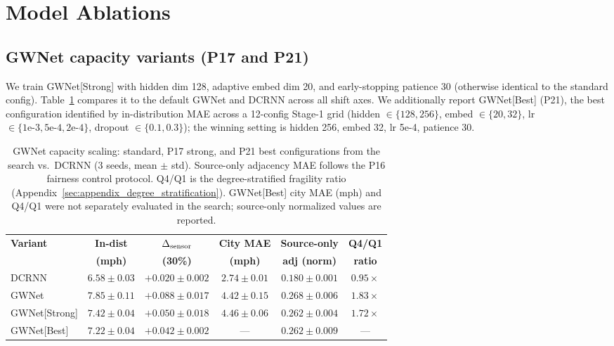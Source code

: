 \section{Model Ablations}
\label{sec:appendix_ablations_group}

\subsection{GWNet capacity variants (P17 and P21)}
\label{sec:appendix_stronger_gwnet}

We train GWNet[Strong] with hidden dim 128, adaptive embed dim 20, and early-stopping
patience 30 (otherwise identical to the standard config). Table~\ref{tab:stronger_gwnet}
compares it to the default GWNet and DCRNN across all shift axes.
We additionally report GWNet[Best] (P21), the best configuration identified by
in-distribution MAE across a 12-config Stage-1 grid
(hidden $\in\{128,256\}$, embed $\in\{20,32\}$, lr $\in\{1\text{e-}3,5\text{e-}4,2\text{e-}4\}$,
dropout $\in\{0.1,0.3\}$); the winning setting is hidden 256, embed 32, lr 5e-4, patience 30.

\begin{table}[h]
\centering
\caption{GWNet capacity scaling: standard, P17 strong, and P21 best configurations from the search vs.\ DCRNN
(3 seeds, mean $\pm$ std).
Source-only adjacency MAE follows the P16 fairness control protocol.
Q4/Q1 is the degree-stratified fragility ratio (Appendix~\ref{sec:appendix_degree_stratification}).
GWNet[Best] city MAE (mph) and Q4/Q1 were not separately evaluated in the search;
source-only normalized values are reported.}
\label{tab:stronger_gwnet}
\vskip 0.1in
\small
\begin{tabular}{lccccc}
\toprule
\textbf{Variant} & \textbf{In-dist} & \textbf{$\Delta_{\text{sensor}}$} & \textbf{City MAE} & \textbf{Source-only} & \textbf{Q4/Q1} \\
 & \textbf{(mph)} & \textbf{(30\%)} & \textbf{(mph)} & \textbf{adj (norm)} & \textbf{ratio} \\
\midrule
DCRNN         & $6.58 \pm 0.03$ & $+0.020 \pm 0.002$ & $2.74 \pm 0.01$ & $0.180 \pm 0.001$ & $0.95\times$ \\
GWNet         & $7.85 \pm 0.11$ & $+0.088 \pm 0.017$ & $4.42 \pm 0.15$ & $0.268 \pm 0.006$ & $1.83\times$ \\
GWNet[Strong] & $7.42 \pm 0.04$ & $+0.050 \pm 0.018$ & $4.46 \pm 0.06$ & $0.262 \pm 0.004$ & $1.72\times$ \\
GWNet[Best]   & $7.22 \pm 0.04$ & $+0.042 \pm 0.002$ & ---             & $0.262 \pm 0.009$ & ---          \\
\bottomrule
\end{tabular}
\end{table}

